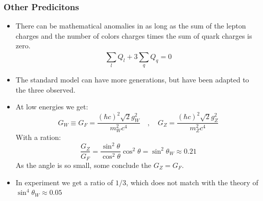\subsubsection{Other Predicitons}
\begin{itemize}
  \item There can be mathematical anomalies in as long as the sum of the lepton charges and  the number of colors charges times the sum of quark charges is zero. 
  \begin{equation}
    ∑_{l}^{} Q_l + 3 ∑_{q}^{} Q_q = 0
  \end{equation}
  \item The standard model can have more generations, but have been adapted to the three observed. 
  \item At low energies we get:
  \begin{equation}
    G_{W} ≡ G_{F} = \frac{(ℏc)^2 \sqrt{2}g^2_{W}}{m^2_{W}c^4}  \quad , \quad  G_{Z} = \frac{(ℏc)^2 \sqrt{2}g^2_{Z}}{m^2_{Z}c^4}
  \end{equation}
  With a ration:
  \begin{equation}
    \frac{G_{Z}}{G_{F}} = \frac{\sin ^2θ}{\cos ^2θ}\cos ^2θ = \sin ^2θ_{W} ≈ 0.21
  \end{equation}
  As the angle is so small, some conclude the $G_{Z} = G_{F}$.
  \item In experiment we get a ratio of $1/3$, which does not match with the theory of $\sin^4 θ_{W} ≈ 0.05$
\end{itemize} 